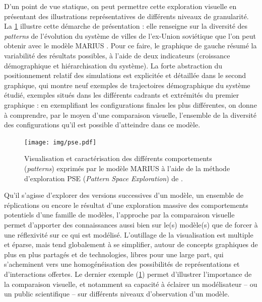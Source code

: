 \documentclass[a4paper, 12pt]{article}
\begin{document}
D'un point de vue statique, on peut permettre cette exploration visuelle en présentant des illustrations représentatives de différents niveaux de granularité.
La \cref{fig:pse} illustre cette démarche de présentation : elle renseigne sur la diversité des \og \textit{patterns}\fg{} de l'évolution du système de villes de l'ex-Union soviétique que l'on peut obtenir avec le modèle MARIUS \autocite{cottineau_levolution_2014}.
Pour ce faire, le graphique de gauche résumé la variabilité des résultats possibles, à l'aide de deux indicateurs (croissance démographique et hiérarchisation du système).
La forte abstraction du positionnement relatif des simulations est explicitée et détaillée dans le second graphique, qui montre neuf exemples de trajectoires démographique du système étudié, exemples situés dans les différents cadrants et extrémités du premier graphique : en exemplifiant les configurations finales les plus différentes, on donne à comprendre, par le moyen d'une comparaison visuelle, l'ensemble de la diversité des configurations qu'il est possible d'atteindre dans ce modèle.

\begin{figure}[H]
	\centering
	\texttt{[image: img/pse.pdf]}
	\caption{Visualisation et caractérisation des différents comportements (\og \textit{patterns}\fg{}) exprimés par le modèle MARIUS \autocite{cottineau_levolution_2014} à l'aide de la méthode d'exploration PSE (\textit{Pattern Space Exploration}) de \textcite{cherel_beyond_2015}.}
	\label{fig:pse}
\end{figure}

\bigskip 

Qu'il s'agisse d'explorer des versions successives d'un modèle, un ensemble de réplications ou encore le résultat d'une exploration massive des comportements potentiels d'une famille de modèles, l'approche par la comparaison visuelle permet d'apporter des connaissances aussi bien sur le(s) modèle(s) que de forcer à une réflexivité sur ce qui est modélisé.
L'outillage de la visualisation est multiple et éparse, mais tend globalement à se simplifier, autour de concepts graphiques de plus en plus partagés et de technologies, libres pour une large part, qui s'acheminent vers une homogénéisation des possibilités de représentations et d'interactions offertes.
Le dernier exemple (\cref{fig:pse}) permet d'illustrer l'importance de la comparaison visuelle, et notamment sa capacité à éclairer un modélisateur -- ou un public scientifique -- sur différents niveaux d'observation d'un modèle.
\end{document}
